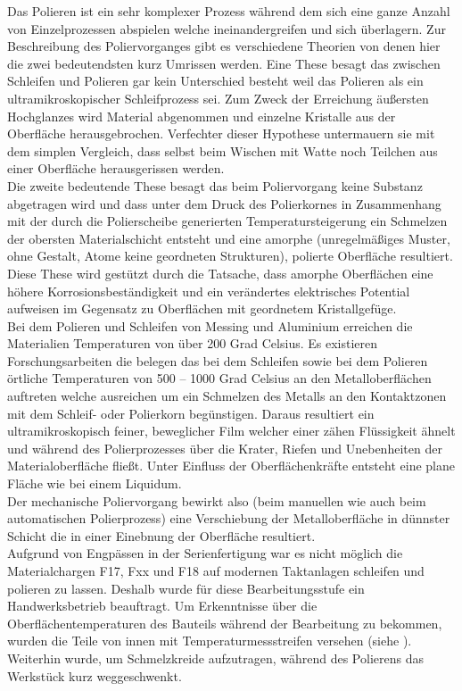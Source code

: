 \documentclass[12pt,a4paper,parskip,twoside,BCOR5mm,headsepline]{scrartcl}
\begin{document}
Das Polieren ist ein sehr komplexer Prozess während dem sich eine ganze Anzahl von Einzelprozessen abspielen welche ineinandergreifen und sich überlagern. Zur Beschreibung des Poliervorganges gibt es verschiedene Theorien von denen hier die zwei bedeutendsten kurz Umrissen werden. Eine These besagt das zwischen Schleifen und Polieren gar kein Unterschied besteht weil  das Polieren als ein ultramikroskopischer Schleifprozess sei. Zum Zweck der Erreichung  äußersten Hochglanzes wird Material abgenommen und einzelne Kristalle aus der Oberfläche herausgebrochen. Verfechter dieser Hypothese untermauern sie mit dem simplen Vergleich, dass selbst beim Wischen mit Watte noch Teilchen aus einer Oberfläche herausgerissen werden.\\ Die zweite bedeutende These besagt das beim Poliervorgang keine Substanz abgetragen wird und dass unter dem Druck des Polierkornes in Zusammenhang mit der durch die Polierscheibe generierten Temperatursteigerung ein Schmelzen der obersten Materialschicht entsteht und eine amorphe (unregelmäßiges Muster, ohne Gestalt, Atome keine geordneten Strukturen), polierte Oberfläche resultiert. Diese These wird gestützt durch die Tatsache, dass amorphe Oberflächen eine höhere Korrosionsbeständigkeit und ein verändertes elektrisches Potential aufweisen im Gegensatz zu Oberflächen mit geordnetem Kristallgefüge.\autocite[38]{hsp}\\  Bei dem Polieren und Schleifen von Messing und Aluminium erreichen die Materialien Temperaturen von über 200 Grad Celsius. Es existieren Forschungsarbeiten die belegen das bei dem Schleifen sowie bei dem Polieren örtliche Temperaturen von 500 – 1000 Grad Celsius an den Metalloberflächen auftreten welche ausreichen um ein Schmelzen des Metalls an den Kontaktzonen mit dem Schleif- oder Polierkorn begünstigen. Daraus resultiert ein ultramikroskopisch feiner, beweglicher Film welcher  einer zähen Flüssigkeit ähnelt und während des Polierprozesses über die Krater, Riefen und Unebenheiten der Materialoberfläche fließt. Unter Einfluss der Oberflächenkräfte entsteht eine plane Fläche wie bei einem Liquidum.\\ Der mechanische Poliervorgang bewirkt also (beim manuellen wie auch beim automatischen Polierprozess) eine Verschiebung der Metalloberfläche in dünnster Schicht die in einer Einebnung der Oberfläche resultiert.\autocite[40-41]{hsp} \\
Aufgrund von Engpässen in der Serienfertigung war es nicht möglich die Materialchargen F17, Fxx und F18 auf modernen Taktanlagen schleifen und polieren zu lassen. Deshalb wurde für diese Bearbeitungsstufe ein Handwerksbetrieb beauftragt. Um Erkenntnisse über die Oberflächentemperaturen des Bauteils während der Bearbeitung zu bekommen, wurden die Teile von innen mit Temperaturmessstreifen versehen (siehe ). Weiterhin wurde, um Schmelzkreide aufzutragen, während des Polierens das Werkstück kurz weggeschwenkt.
\end{document}
